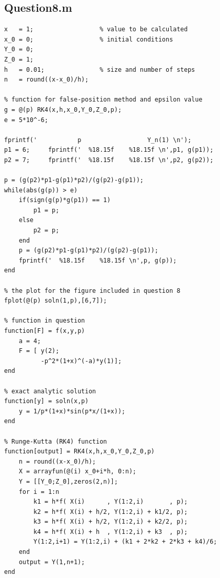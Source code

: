 \documentclass[a4paper]{article}
\begin{document}
\subsection*{Question\textunderscore8.m}
\begin{lstlisting}[style = Matlab-editor]
x   = 1;                  % value to be calculated
x_0 = 0;                  % initial conditions
Y_0 = 0;
Z_0 = 1;
h   = 0.01;               % size and number of steps
n   = round((x-x_0)/h);

% function for false-position method and epsilon value
g = @(p) RK4(x,h,x_0,Y_0,Z_0,p);
e = 5*10^-6;

fprintf('           p                  Y_n(1) \n');
p1 = 6;     fprintf('  %18.15f    %18.15f \n',p1, g(p1));
p2 = 7;     fprintf('  %18.15f    %18.15f \n',p2, g(p2));

p = (g(p2)*p1-g(p1)*p2)/(g(p2)-g(p1));
while(abs(g(p)) > e)
    if(sign(g(p)*g(p1)) == 1)
        p1 = p;
    else
        p2 = p;
    end
    p = (g(p2)*p1-g(p1)*p2)/(g(p2)-g(p1));
    fprintf('  %18.15f    %18.15f \n',p, g(p));
end

% the plot for the figure included in question 8
fplot(@(p) soln(1,p),[6,7]);

% function in question
function[F] = f(x,y,p)
    a = 4;
    F = [ y(2);
          -p^2*(1+x)^(-a)*y(1)];
end

% exact analytic solution
function[y] = soln(x,p)
    y = 1/p*(1+x)*sin(p*x/(1+x));
end

% Runge-Kutta (RK4) function
function[output] = RK4(x,h,x_0,Y_0,Z_0,p)
    n = round((x-x_0)/h);
    X = arrayfun(@(i) x_0+i*h, 0:n);
    Y = [[Y_0;Z_0],zeros(2,n)];
    for i = 1:n
        k1 = h*f( X(i)      , Y(1:2,i)       , p);
        k2 = h*f( X(i) + h/2, Y(1:2,i) + k1/2, p);
        k3 = h*f( X(i) + h/2, Y(1:2,i) + k2/2, p);
        k4 = h*f( X(i) + h  , Y(1:2,i) + k3  , p);
        Y(1:2,i+1) = Y(1:2,i) + (k1 + 2*k2 + 2*k3 + k4)/6;
    end
    output = Y(1,n+1);
end
\end{lstlisting}

\pagebreak
\end{document}
